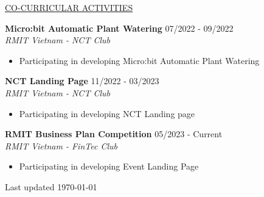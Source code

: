 \documentclass[11pt]{article}
\newcommand{\betteruline}[1]{
    \uline{#1}
}
\newcommand{\sectiontitle}[1]{
    \begingroup
        \titlebold
        \betteruline{\Large\uppercase{#1}  }
        \vspace{1.7mm}
    \endgroup
}
\newcommand{\sectioncontent}[1]{
    \begingroup
        \begin{FlushLeft}
        \vspace{-3mm}
        \sffamily\small#1
        \end{FlushLeft}
    \endgroup
    \vspace{2mm}
}
\newcommand{\project}[2]{
    \begingroup
        \textbf{\small#1}
        \hfill\color{black!70}\small{#2}
    \endgroup
}
\newcommand{\spacevv}{
    \vspace{2mm}
}
\begin{document}
\begin{paracol}{2}
    \sectiontitle{CO-CURRICULAR ACTIVITIES}
    \sectioncontent{
    \vspace{1mm} 
          \project{Micro:bit Automatic Plant Watering}{07/2022 - 09/2022} \\
          \textcolor{black!70}{\textit{RMIT Vietnam - NCT Club}}
          \vspace{1mm} 
          \begin{itemize}
            \item Participating in developing Micro:bit Automatic Plant Watering
          \end{itemize}
          \spacevv
        
          \project{NCT Landing Page}{11/2022 - 03/2023} \\
          \textcolor{black!70}{\textit{RMIT Vietnam - NCT Club}}
          \vspace{1mm} 
          \begin{itemize}
            \item Participating in developing NCT Landing page 
          \end{itemize}
          \spacevv
        
          \project{RMIT Business Plan Competition}{05/2023 - Current} \\
          \textcolor{black!70}{\textit{RMIT Vietnam - FinTec Club}}
          \vspace{1mm} 
          \begin{itemize}
            \item Participating in developing Event Landing Page 
          \end{itemize}
          \spacevv
    
    }

    \normaltext \hfill \tiny Last updated \today

    \end{paracol}
\end{document}
